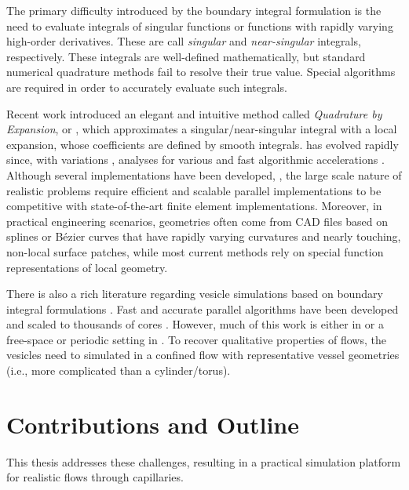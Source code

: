 The primary difficulty introduced by the boundary integral formulation is the need to evaluate integrals of singular functions or functions with rapidly varying high-order derivatives. These are call \textit{singular} and \textit{near-singular} integrals, respectively.
These integrals are well-defined mathematically, but standard numerical quadrature methods fail to resolve their true value.
Special algorithms are required in order to accurately evaluate such integrals.

Recent work \cite{barnett2014evaluation,KBGO} introduced an elegant and intuitive method called \textit{Quadrature by Expansion}, or \qbx, which approximates a singular/near-singular integral with a local expansion, whose coefficients are defined by smooth integrals.
\qbx has evolved rapidly since, with variations \cite{ST,aT1,RBZ,af2016fast}, analyses \cite{EGK,aT2,klinteberg2020quadrature} for various \pdes and fast algorithmic accelerations \cite{RKO,wala20193d,wala2019optimization,wala2020approximation}.
Although several \threed implementations have been developed, \cite{ST, wala2019optimization,wala2020approximation, wala20193d}, the large scale nature of realistic problems require efficient and scalable parallel implementations to be competitive with state-of-the-art finite element implementations.
Moreover, in practical engineering scenarios, geometries often come from CAD files based on splines or B\'ezier curves that have rapidly varying curvatures and nearly touching, non-local surface patches, while most current \qbx methods rely on special function representations of local geometry.

There is also a rich literature regarding vesicle simulations based on boundary integral formulations \cite{Veerapaneni2009,Veerapaneni2009b,Veerapaneni2011,ghigliotti2011,rahimian2015,lu2017,sorgentone2018highly,sorgentone20193d}.
Fast and accurate parallel algorithms have been developed and scaled to thousands of cores \cite{lu2018parallel,rahimian2010petascale,Malhotra2017}. 
However, much of this work is either in \twod \cite{Veerapaneni2009,Veerapaneni2009b,Veerapaneni2011,lu2017} or a free-space or periodic setting in \threed \cite{rahimian2010petascale,rahimian2015,lu2018parallel,Malhotra2017,sorgentone2018highly,sorgentone20193d}.
To recover qualitative properties of \rbc flows, the vesicles need to simulated in a confined flow with representative vessel geometries (i.e., more complicated than a cylinder/torus).

\section{Contributions and Outline}
This thesis addresses these challenges, resulting in a practical simulation platform for realistic \rbc flows through capillaries.


